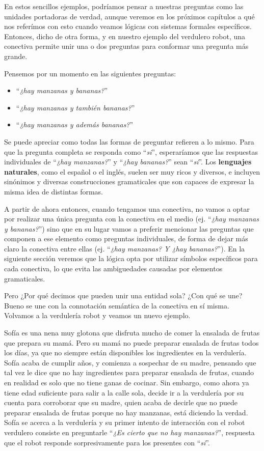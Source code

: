 En estos sencillos ejemplos, podríamos pensar a nuestras preguntas como las
unidades portadoras de verdad, aunque veremos en los próximos capítulos a qué
nos referímos con esto cuando veamos lógicas con sistemas formales específicos.
Entonces, dicho de otra forma, y en nuestro ejemplo del verdulero robot, una
conectiva permite unir una o dos preguntas para conformar una pregunta más
grande.

Pensemos por un momento en las siguientes preguntas:
\begin{itemize}
    \item ``\textit{¿hay manzanas y bananas?}''
    \item ``\textit{¿hay manzanas y también bananas?}''
    \item ``\textit{¿hay manzanas y además bananas?}''
\end{itemize}

Se puede apreciar como todas las formas de preguntar refieren a lo mismo. Para
que la pregunta completa se responda como ``\textit{si}'', esperaríamos que las
respuestas individuales de ``\textit{¿hay manzanas?}'' y ``\textit{¿hay
bananas?}'' sean ``\textit{si}''. Los \textbf{lenguajes
naturales}, como el español o el inglés, suelen ser muy
ricos y diversos, e incluyen sinónimos y diversas construcciones gramaticales
que son capaces de expresar la misma idea de distintas formas.

A partir de ahora entonces, cuando tengamos una conectiva, no vamos a optar por
realizar una única pregunta con la conectiva en el medio (ej. ``\textit{¿hay
manzanas y bananas?}'') sino que en su lugar vamos a preferir mencionar las
preguntas que componen a ese elemento como preguntas individuales, de forma de
dejar más claro la conectiva entre ellas (ej. ``\textit{¿hay manzanas? Y ¿hay
bananas?}''). En la siguiente sección veremos que la lógica opta por utilizar
símbolos específicos para cada conectiva, lo que evita las ambiguedades causadas
por elementos gramaticales.

Pero ¿Por qué decimos que pueden unir una entidad sola? ¿Con qué se une? Bueno
se une con la connotación semántica de la conectiva en sí misma. Volvamos a la
verdulería robot y veamos un nuevo ejemplo.

Sofía es una nena muy glotona que disfruta mucho de comer la ensalada de frutas
que prepara su mamá. Pero su mamá no puede preparar ensalada de frutas todos los
días, ya que no siempre están disponibles los ingredientes en la verdulería.
Sofía acaba de cumplir años, y comienza a sospechar de su madre, pensando que
tal vez le dice que no hay ingredientes para preparar ensalada de frutas, cuando
en realidad es solo que no tiene ganas de cocinar. Sin embargo, como ahora ya
tiene edad suficiente para salir a la calle sola, decide ir a la verdulería por
su cuenta para corroborar que su madre, quien acaba de decirle que no puede
preparar ensalada de frutas porque no hay manzanas, está diciendo la verdad.
Sofía se acerca a la verdulería y su primer intento de interacción con el robot
verdulero consiste en preguntarle ``\textit{¿Es cierto que no hay manzanas?}'',
respuesta que el robot responde sorpresivamente para los presentes con
``\textit{si}''.


